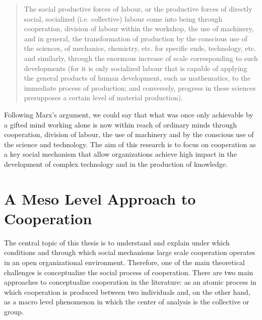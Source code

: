 \begin{quote}
The social productive forces of labour, or the productive forces of directly social, socialized (i.e. collective) labour come into being through cooperation, division of labour within the workshop, the use of machinery, and in general, the transformation of production by the conscious use of the sciences, of mechanics, chemistry, etc. for specific ends, technology, etc. and similarly, through the enormous increase of scale corresponding to such developments (for it is only socialized labour that is capable of applying the general products of human development, such as mathematics, to the immediate process of production; and conversely, progress in these sciences presupposes a certain level of material production). \citep[1024]{marx:1990}
\end{quote}

Following Marx's argument, we could say that what was once only achievable by a gifted mind working alone is now within reach of ordinary minds through cooperation, division of labour, the use of machinery and by the conscious use of the science and technology. The aim of this research is to focus on cooperation as a key social mechanism that allow organizations achieve high impact in the development of complex technology and in the production of knowledge.

\section{A Meso Level Approach to Cooperation}

The central topic of this thesis is to understand and explain under which conditions and through which social mechanisms large scale cooperation operates in an open organizational environment. Therefore, one of the main theoretical challenges is conceptualize the social process of cooperation. There are two main approaches to conceptualize cooperation in the literature: as an atomic process in which cooperation is produced between two individuals and, on the other hand, as a macro level phenomenon in which the center of analysis is the collective or group.

